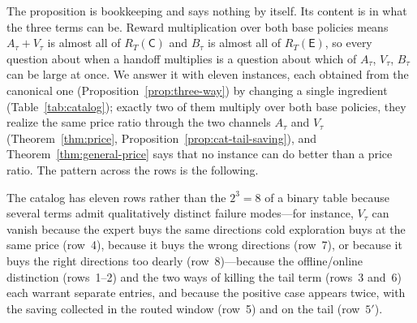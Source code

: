 \documentclass{article}
\theoremstyle{definition}
\theoremstyle{remark}
\theoremstyle{remark}
\newcommand{\Cold}{\mathsf{C}}
\newcommand{\Exp}{\mathsf{E}}
\begin{document}
The proposition is bookkeeping and says nothing by itself. Its content is in
what the three terms can be. Reward multiplication over both base policies
means $A_\tau+V_\tau$ is almost all of $R_T(\Cold)$ and $B_\tau$ is almost all
of $R_T(\Exp)$, so every question about when a handoff multiplies is a
question about which of $A_\tau$, $V_\tau$, $B_\tau$ can be large at once. We
answer it with eleven instances, each obtained from the canonical one
(Proposition~\ref{prop:three-way}) by changing a single ingredient
(Table~\ref{tab:catalog}); exactly two of them multiply over both base
policies, they realize the same price ratio through the two channels
$A_\tau$ and $V_\tau$ (Theorem~\ref{thm:price},
Proposition~\ref{prop:cat-tail-saving}), and Theorem~\ref{thm:general-price}
says that no instance can do better than a price ratio. The pattern across
the rows is the following.


\begin{center}
\end{center}

The catalog has eleven rows rather than the $2^3=8$ of a binary table
because several terms admit qualitatively distinct failure modes---for
instance, $V_\tau$ can vanish because the expert buys the same directions cold
exploration buys at the same price (row~4), because it buys the wrong
directions (row~7), or because it buys the right directions too dearly
(row~8)---because the offline/online distinction (rows~1--2) and the two
ways of killing the tail term (rows~3 and~6) each warrant separate entries,
and because the positive case appears twice, with the saving collected in
the routed window (row~5) and on the tail (row~$5'$).
\end{document}
